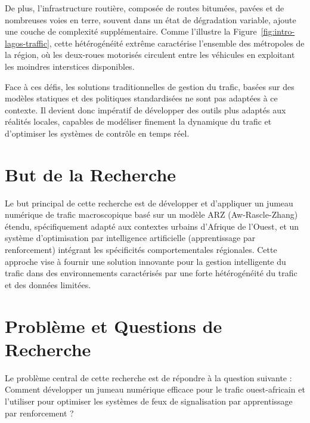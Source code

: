 De plus, l'infrastructure routière, composée de routes bitumées, pavées et de nombreuses voies en terre, souvent dans un état de dégradation variable, ajoute une couche de complexité supplémentaire. Comme l'illustre la Figure~\ref{fig:intro-lagos-traffic}, cette hétérogénéité extrême caractérise l'ensemble des métropoles de la région, où les deux-roues motorisés circulent entre les véhicules en exploitant les moindres interstices disponibles.

Face à ces défis, les solutions traditionnelles de gestion du trafic, basées sur des modèles statiques et des politiques standardisées ne sont pas adaptées à ce contexte. Il devient donc impératif de développer des outils plus adaptés aux réalités locales, capables de modéliser finement la dynamique du trafic et d'optimiser les systèmes de contrôle en temps réel.

\section{But de la Recherche}
\label{sec:but_recherche}

Le but principal de cette recherche est de développer et d'appliquer un jumeau numérique de trafic macroscopique basé sur un modèle ARZ (Aw-Rascle-Zhang) étendu, spécifiquement adapté aux contextes urbains d'Afrique de l'Ouest, et un système d'optimisation par intelligence artificielle (apprentissage par renforcement) intégrant les spécificités comportementales régionales. Cette approche vise à fournir une solution innovante pour la gestion intelligente du trafic dans des environnements caractérisés par une forte hétérogénéité du trafic et des données limitées.

\section{Problème et Questions de Recherche}
\label{sec:probleme_questions}

Le problème central de cette recherche est de répondre à la question suivante : Comment développer un jumeau numérique efficace pour le trafic ouest-africain et l'utiliser pour optimiser les systèmes de feux de signalisation par apprentissage par renforcement ?

